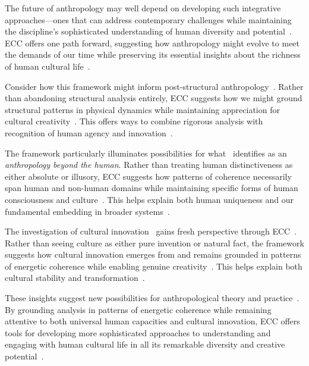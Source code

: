 The future of anthropology may well depend on developing such integrative approaches---ones that can address contemporary challenges while maintaining the discipline's sophisticated understanding of human diversity and potential~\cite{ortner2016dark, moore2011still}. ECC offers one path forward, suggesting how anthropology might evolve to meet the demands of our time while preserving its essential insights about the richness of human cultural life~\cite{haraway2016staying, tsing2015mushroom}.

Consider how this framework might inform post-structural anthropology~\cite{viveiros2014cannibal, latour2005reassembling}. Rather than abandoning structural analysis entirely, ECC suggests how we might ground structural patterns in physical dynamics while maintaining appreciation for cultural creativity~\cite{bourdieu1977outline}. This offers ways to combine rigorous analysis with recognition of human agency and innovation~\cite{jackson1989paths, ingold2011being}.

The framework particularly illuminates possibilities for what~\cite{kohn2013how, haraway2003companion} identifies as an \textit{anthropology beyond the human}. Rather than treating human distinctiveness as either absolute or illusory, ECC suggests how patterns of coherence necessarily span human and non-human domains while maintaining specific forms of human consciousness and culture~\cite{tsing2015mushroom}. This helps explain both human uniqueness and our fundamental embedding in broader systems~\cite{latour1993modern, ingold2011being}.

The investigation of cultural innovation~ gains fresh perspective through ECC~\cite{wagner2016invention, strathern1980nature}. Rather than seeing culture as either pure invention or natural fact, the framework suggests how cultural innovation emerges from and remains grounded in patterns of energetic coherence while enabling genuine creativity~\cite{ingold2013making}. This helps explain both cultural stability and transformation~\cite{bateson2000steps, csordas1990embodiment}.

These insights suggest new possibilities for anthropological theory and practice~\cite{rabinow2008marking, fischer2018anthropology}. By grounding analysis in patterns of energetic coherence while remaining attentive to both universal human capacities and cultural innovation, ECC offers tools for developing more sophisticated approaches to understanding and engaging with human cultural life in all its remarkable diversity and creative potential~\cite{haraway2016staying, moore2011still}.

